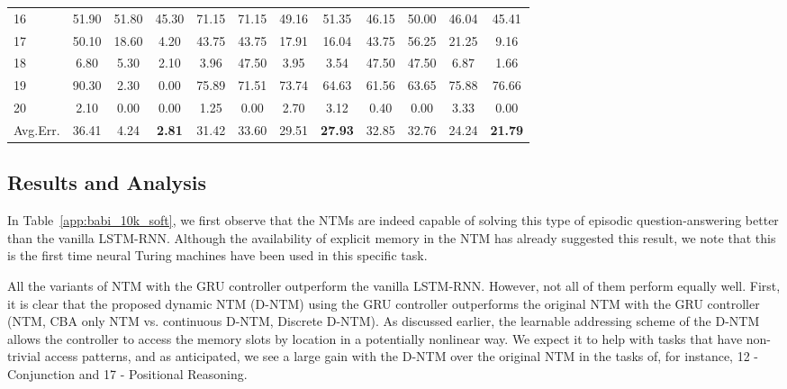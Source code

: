 \documentclass[12pt]{article}
\begin{document}
\begin{table*}[htbp]
\begin{tabular}{ | l || c | c | c || c |c |c|c|| c | c | c|c| }
16  &   51.90   &   51.80   &   45.30   &   71.15   &   71.15   &   49.16   &   51.35   &   46.15   &   50.00   &   46.04   &   45.41  \\
17  &   50.10   &   18.60   &   4.20    &   43.75   &   43.75   &   17.91   &   16.04   &   43.75   &   56.25   &   21.25   &   9.16   \\
18  &   6.80    &   5.30    &   2.10    &   3.96    &   47.50   &   3.95    &   3.54    &   47.50   &   47.50   &   6.87    &   1.66   \\
19  &   90.30   &   2.30    &   0.00    &   75.89   &   71.51   &   73.74   &   64.63   &   61.56   &   63.65   &   75.88   &   76.66  \\
20  &   2.10    &   0.00    &   0.00    &   1.25    &   0.00    &   2.70    &   3.12    &   0.40    &   0.00    &   3.33    &   0.00   \\\hline



Avg.Err. & 36.41 & 4.24 & \textbf{2.81} & 31.42 & 33.60 & 29.51 & \textbf{27.93} & 32.85 & 32.76 & 24.24 & \textbf{21.79} \\\hline
\end{tabular}
\caption{Test error rates (\%) on the 20 bAbI QA tasks for models using 10k training examples with the GRU and feedforward controller. FF stands for the experiments that are conducted with feedforward controller. Let us, note that LBA refers to NTM that uses both LBA and CBA. In this table, we compare multi-step vs single-step addressing, original NTM with location based+content based addressing vs only content based addressing, and discrete vs continuous addressing on bAbI.}
\label{app:babi_10k_soft}
\end{table*}


\subsection{Results and Analysis}

In Table~\ref{app:babi_10k_soft}, we first observe that the NTMs are indeed capable of solving this type of episodic question-answering better than the vanilla LSTM-RNN. Although the availability of explicit memory in the NTM has already suggested this result, we note that this is the first time neural Turing machines have been used in this specific task.

All the variants of NTM with the GRU controller outperform the vanilla LSTM-RNN. However, not all of them perform equally well. First, it is clear that the proposed dynamic NTM (D-NTM) using the GRU controller outperforms the original NTM with the GRU controller (NTM, CBA only NTM vs. continuous D-NTM, Discrete D-NTM). As discussed earlier, the learnable addressing scheme of the D-NTM allows the controller to access the memory slots by location in a potentially nonlinear way. We expect it to help with tasks that have non-trivial access patterns, and as anticipated, we see a large gain with the D-NTM over the original NTM in the tasks of, for instance, 12 - Conjunction and 17 - Positional Reasoning. 
\end{document}
